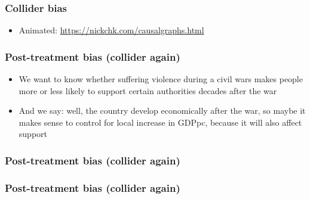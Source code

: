 \documentclass[aspectratio=43]{beamer}
\begin{document}
\begin{frame}
\frametitle{Collider bias}
\centering

\begin{itemize}
  \item Animated: \url{https://nickchk.com/causalgraphs.html}
\end{itemize}

\end{frame}


\begin{frame}
\frametitle{Post-treatment bias (collider again)}
\centering

\begin{itemize}[<+->]
  \item We want to know whether suffering violence during a civil wars makes people more or less likely to support certain authorities decades after the war
  \item And we say: well, the country develop economically after the war, so maybe it makes sense to control for local increase in GDPpc, because it will also affect support
\end{itemize}

\end{frame}

\begin{frame}
\frametitle{Post-treatment bias (collider again)}
\centering


\end{frame}

\begin{frame}
\frametitle{Post-treatment bias (collider again)}
\centering


\end{frame}
\end{document}
